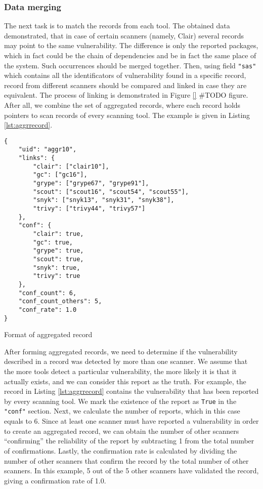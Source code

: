 \subsubsection*{Data merging}

The next task is to match the records from each tool. The obtained data demonstrated, that in case of certain scanners (namely, Clair) several records may point to the same vulnerability. The difference is only the reported packages, which in fact could be the chain of dependencies and be in fact the same place of the system. Such occurrences should be merged together. Then, using field \texttt{"sas"} which contains all the identificators of vulnerability found in a specific record, record from different scanners should be compared and linked in case they are equivalent. The process of linking is demonstrated in Figure \ref{} \#TODO figure. After all, we combine the set of aggregated records, where each record holds pointers to scan records of every scanning tool. The example is given in Listing \ref{lst:aggrrecord}.


\begin{listing}[htp]
    \centering
    \begin{minipage}{0.7\linewidth}
        \begin{verbatim}
{
    "uid": "aggr10",
    "links": {
        "clair": ["clair10"],
        "gc": ["gc16"],
        "grype": ["grype67", "grype91"],
        "scout": ["scout16", "scout54", "scout55"],
        "snyk": ["snyk13", "snyk31", "snyk38"],
        "trivy": ["trivy44", "trivy57"]
    },
    "conf": {
        "clair": true,
        "gc": true,
        "grype": true,
        "scout": true,
        "snyk": true,
        "trivy": true
    },
    "conf_count": 6,
    "conf_count_others": 5,
    "conf_rate": 1.0
}
        \end{verbatim}
    \end{minipage}
    \caption{Format of aggregated record}
    \label{lst:aggrrecord}
\end{listing}

After forming aggregated records, we need to determine if the vulnerability described in a record was detected by more than one scanner. We assume that the more tools detect a particular vulnerability, the more likely it is that it actually exists, and we can consider this report as the truth. For example, the record in Listing \ref{lst:aggrrecord} contains the vulnerability that has been reported by every scanning tool. We mark the existence of the report as \texttt{True} in the \texttt{"conf"} section. Next, we calculate the number of reports, which in this case equals to 6. Since at least one scanner must have reported a vulnerability in order to create an aggregated record, we can obtain the number of other scanners ``confirming'' the reliability of the report by subtracting 1 from the total number of confirmations. Lastly, the confirmation rate is calculated by dividing the number of other scanners that confirm the record by the total number of other scanners. In this example, 5 out of the 5 other scanners have validated the record, giving a confirmation rate of 1.0.


